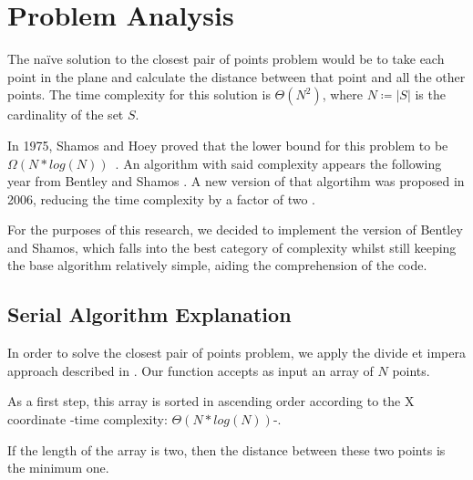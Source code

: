 \section{Problem Analysis}
\label{sec:problem_analysis}

The na\"ive solution to the closest pair of points problem would be to take each point
in the plane and calculate the distance between that point and all
the other points. The time complexity for this solution is $\Theta(N^2)$,
where $N\coloneqq|S|$ is the cardinality of the set $S$.


In 1975, Shamos and Hoey proved that the lower bound for this problem to be $\Omega(N * log(N))$~\cite[§2, theorem 1]{closest_pair_definition}. An algorithm with said complexity appears
the following year from Bentley and Shamos \cite{divide_and_conq_3NlgN}.
A new version of that algortihm was proposed in 2006, reducing the time complexity by a factor of two \cite{ge2006improved}.

For the purposes of this research, we decided to implement the version of Bentley and Shamos, which falls into the best category of complexity whilst still keeping the base algorithm relatively simple, aiding the comprehension of the code.

\subsection{Serial Algorithm Explanation}

In order to solve the closest pair of points problem, we apply the divide et impera approach described in \cite{divide_and_conq_3NlgN}.
Our function accepts as input an array of $N$ points.

As a first step, this array is sorted in ascending order according to the X coordinate -time complexity: $\Theta(N*log(N))$-.

If the length of the array is two, then the distance between these two points is the minimum one.

